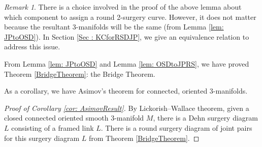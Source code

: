 \documentclass{amsart}
\theoremstyle{plain}
\newtheorem{thm}{Theorem}
\theoremstyle{remark}
\newtheorem{rem}{Remark}
\theoremstyle{definition}
\newcommand{\s}{\mathbb{S}}
\begin{document}
\begin{rem}\label{rem: AmbiguityInOSDtoJP}
    There is a choice involved in the proof of the above lemma about which component to assign a round 2-surgery curve. 
    However, it does not matter because the resultant 3-manifolds will be the same (from Lemma \ref{lem: JPtoOSD}). 
    In Section \ref{Sec : KCforRSDJP}, we give an equivalence relation to address this issue. 
\end{rem} 

From Lemma \ref{lem: JPtoOSD} and Lemma \ref{lem: OSDtoJPRS}, we have proved Theorem \ref{BridgeTheorem}: the Bridge Theorem. 

As a corollary, we have Asimov's theorem for connected, oriented 3-manifolds. 

\begin{proof}[Proof of Corollary \ref{cor: AsimovResult}]
    By Lickorish--Wallace theorem, given a closed connected oriented smooth 3-manifold $M$, there is a Dehn surgery diagram $L$ consisting of a framed link $L$. 
   There is a round surgery diagram of joint pairs for this surgery diagram $L$ from Theorem \ref{BridgeTheorem}. 
\end{proof}
\end{document}
